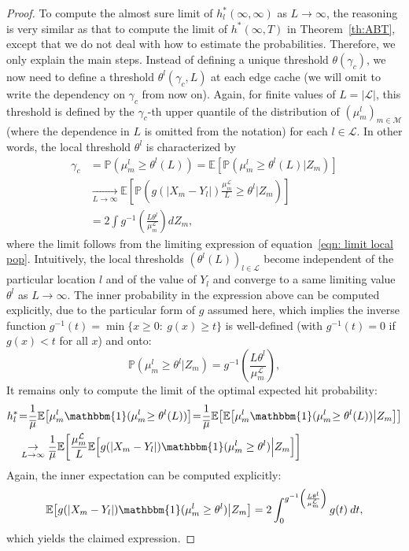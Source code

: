 \documentclass[10pt, conference, letterpaper]{IEEEtran}
\newcommand{\mean}[1]{\mathbb{E}\!\left[#1\right]}
\newcommand{\prob}[1]{\mathbb{P}\!\left(#1\right)}
\def\ind{\mathbbm{1}}
\def\Mcal{\mathcal{M}}
\def\Lcal{\mathcal{L}}
\begin{document}
\begin{proof}
To compute the almost sure limit of $h^*_l(\infty,\infty)$ as $L\to\infty$, the reasoning is very similar as that to compute the limit of $h^*(\infty,T)$ in Theorem~\ref{th:ABT}, except that we do not deal with how to estimate the probabilities. Therefore, we only explain the main steps. Instead of defining a unique threshold $\theta(\gamma_c)$, we now need to define a threshold $\theta^l(\gamma_c,L)$ at each edge cache (we will omit to write the dependency on $\gamma_c$ from now on). Again, for finite values of $L=|\Lcal|$, this threshold is defined by the $\gamma_c$-th upper quantile of the distribution of $(\mu_m^l)_{m\in\Mcal}$ (where the dependence in $L$ is omitted from the notation) for each $l\in\Lcal$. In other words, the local threshold $\theta^l$ is characterized by 
\begin{align*}
\gamma_c&=\prob{\mu_m^l\geq\theta^l(L)}=\mean{\prob{\mu_m^l\geq\theta^l(L)\big|Z_m}}\\
&\underset{L\to\infty}\to\mean{\prob{g(|X_m-Y_l|)\frac{\mu_m^\mathcal L}L\geq\theta^l\Big|Z_m}}\\
&=2\int g^{-1}\left(\frac{L\theta^l}{\mu_m^\mathcal L}\right)dZ_m,
\end{align*}
where the limit follows from the limiting expression of equation~\eqref{eqn: limit local pop}. Intuitively, the local thresholds $(\theta^l(L))_{l\in\Lcal}$ become independent of the particular location $l$ and of the value of $Y_l$ and converge to a same limiting value $\theta^l$ as $L\to\infty$. The inner probability in the expression above can be computed explicitly, due to the particular form of $g$ assumed here, which implies the inverse function $g^{-1}(t)=\min\{x\geq0:\:g(x)\geq t\}$ is well-defined (with $g^{-1}(t)=0$ if $g(x)<t$ for all $x$) and onto:
\[
\prob{\mu_m^l\geq\theta^l\big|Z_m}=g^{-1}\left(\frac{L\theta^l}{\mu_m^\mathcal L}\right),
\]
It remains only to compute the limit of the optimal expected hit probability:
\begin{align*}
h^*_l&\hspace{-0.03in}=\hspace{-0.03in}\frac1{\overline\mu}\mean{\mu_m^l\ind(\mu_m^l\hspace{-0.03in}\geq\theta^l(L))}\hspace{-0.03in}=\hspace{-0.03in}\frac1{\overline\mu}\mean{\mean{\mu_m^l\ind(\mu_m^l\hspace{-0.03in}\geq\theta^l(L))\big|Z_m}}\\
&\underset{L\to\infty}\to\frac1{\overline\mu}\mean{\frac{\mu_m^\mathcal L}L\mean{g(|X_m-Y_l|)\ind(\mu_m^l\geq\theta^l)\Big|Z_m}}
\end{align*}
Again, the inner expectation can be computed explicitly:
\[
\mean{g(|X_m-Y_l|)\ind(\mu_m^l\geq\theta^l)\big|Z_m}=2\int_0^{g^{-1}\left(\frac{L\theta^l}{\mu_m^\mathcal L}\right)} g(t) \:dt,
\]
which yields the claimed expression.
\end{proof}
\end{document}
